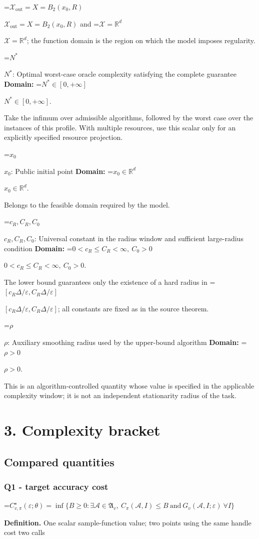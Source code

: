\documentclass[10pt,a4paper]{article}
\newcommand{\AtlasMath}[1]{\par\begingroup\centering\setbox0=\hbox{$\displaystyle #1$}\ifdim\wd0>1.4\linewidth\typeout{ATLAS WIDE FORMULA: \the\wd0}\fi\ifdim\wd0>\linewidth\resizebox{\linewidth}{!}{\box0}\else\box0\fi\par\endgroup}
\newcommand{\AtlasInlineMath}[1]{\begingroup\setbox0=\hbox{$#1$}\ifdim\wd0>.4\linewidth\endgroup\AtlasMath{#1}\else\endgroup$#1$\fi}
\begin{document}
\AtlasInlineMath{\mathcal{X}_{\mathrm{out}}=X=B_2(x_0,R)} and \AtlasInlineMath{\mathcal{X}=\mathbb{R}^d}; the function domain is the region on which the model imposes regularity.

\AtlasInlineMath{N^*}: Optimal worst-case oracle complexity satisfying the complete guarantee \textbf{Domain:} \AtlasInlineMath{N^*\in[0,+\infty]}.

Take the infimum over admissible algorithms, followed by the worst case over the instances of this profile. With multiple resources, use this scalar only for an explicitly specified resource projection.

\AtlasInlineMath{x_0}: Public initial point \textbf{Domain:} \AtlasInlineMath{x_0\in\mathbb{R}^d}.

Belongs to the feasible domain required by the model.

\AtlasInlineMath{c_R,C_R,C_0}: Universal constant in the radius window and sufficient large-radius condition \textbf{Domain:} \AtlasInlineMath{0<c_R\le C_R<\infty,\ C_0>0}.

The lower bound guarantees only the existence of a hard radius in \AtlasInlineMath{[c_R\Delta/\varepsilon,C_R\Delta/\varepsilon]}; all constants are fixed as in the source theorem.

\AtlasInlineMath{\rho}: Auxiliary smoothing radius used by the upper-bound algorithm \textbf{Domain:} \AtlasInlineMath{\rho>0}.

This is an algorithm-controlled quantity whose value is specified in the applicable complexity window; it is not an independent stationarity radius of the task.

\section{3. Complexity bracket}
\subsection{Compared quantities}
\subsubsection{Q1 - target accuracy cost}
\AtlasMath{C^\star_{v,\pi}(\varepsilon;\theta)=\inf\{B\ge0:\exists\mathcal A\in\mathfrak A_v,\ C_\pi(\mathcal A,I)\le B\ \text{and}\ G_v(\mathcal A,I;\varepsilon)\ \forall I\}}
\textbf{Definition.} One scalar sample-function value; two points using the same handle cost two calls
\end{document}
